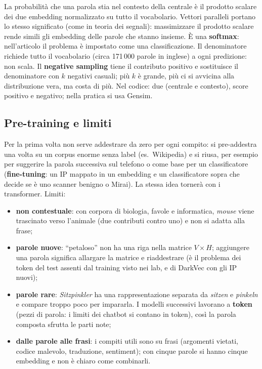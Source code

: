 La probabilità che una parola stia nel contesto della centrale è il prodotto scalare dei due embedding
normalizzato su tutto il vocabolario. Vettori paralleli portano lo stesso significato (come in teoria dei
segnali): massimizzare il prodotto scalare rende simili gli embedding delle parole che stanno insieme. È una
\textbf{softmax}: nell'articolo il problema è impostato come una classificazione. Il denominatore richiede
tutto il vocabolario (circa 171\,000 parole in inglese) a ogni predizione: non scala. Il \textbf{negative
sampling} tiene il contributo positivo e sostituisce il denominatore con $k$ negativi casuali; più $k$ è
grande, più ci si avvicina alla distribuzione vera, ma costa di più. Nel codice: due 
(centrale e contesto), score positivo e negativo; nella pratica si usa Gensim.

\subsection{Pre-training e limiti}
Per la prima volta non serve addestrare da zero per ogni compito: si pre-addestra una volta su un corpus
enorme senza label (es.\ Wikipedia) e si riusa, per esempio per suggerire la parola successiva sul telefono o
come base per un classificatore (\textbf{fine-tuning}: un IP mappato in un embedding e un classificatore sopra
che decide se è uno scanner benigno o Mirai). La stessa idea tornerà con i transformer. Limiti:
\begin{itemize}
  \item \textbf{non contestuale}: con corpora di biologia, favole e informatica, \emph{mouse} viene trascinato
        verso l'animale (due contributi contro uno) e non si adatta alla frase;
  \item \textbf{parole nuove}: ``petaloso'' non ha una riga nella matrice $V \times H$; aggiungere una parola
        significa allargare la matrice e riaddestrare (è il problema dei token del test assenti dal training
        visto nei lab, e di DarkVec con gli IP nuovi);
  \item \textbf{parole rare}: \emph{Sitzpinkler} ha una rappresentazione separata da \emph{sitzen} e
        \emph{pinkeln} e compare troppo poco per impararla. I modelli successivi lavorano a \textbf{token}
        (pezzi di parola: i limiti dei chatbot si contano in token), così la parola composta sfrutta le parti
        note;
  \item \textbf{dalle parole alle frasi}: i compiti utili sono su frasi (argomenti vietati, codice malevolo,
        traduzione, sentiment); con cinque parole si hanno cinque embedding e non è chiaro come combinarli.
\end{itemize}

